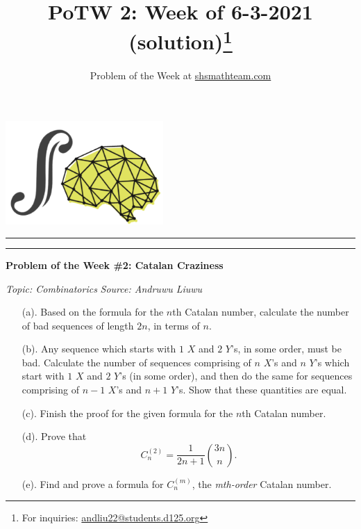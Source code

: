 \documentclass{article}
\title{{\fontfamily{lmss}\selectfont \vspace{-0.5cm}
\textbf{PoTW 2: Week of 6-3-2021 (solution)}\thanks{For inquiries: \href{mailto:andliu22@students.d125.org}{andliu22@students.d125.org}}}}
\author{Problem of the Week at \href{https://shsmathteam.com/problem-of-the-week/}{shsmathteam.com}}
\date{}
\begin{document}
\noindent\hfill\includegraphics[width=6cm]{logo.png}\hfill\hfill\newline
\rule{\textwidth}{1pt} 

\setlength{\parindent}{0cm}
{\let\newpage\relax\maketitle}
\pagestyle{regular}


\vspace{-0.45cm}\rule{\textwidth}{1pt} \vspace{0.3cm}

\begin{potw}\vspace{5pt}
{\large\textbf{Problem of the Week \#2: Catalan Craziness}}\vspace{5pt}

\textit{Topic: Combinatorics}\newline
\textit{Source: Andruwu Liuwu}

\begin{enumerate}
    \item [(a).] Based on the formula for the $n$th Catalan number, calculate the number of bad sequences of length $2n$, in terms of $n$.
    \item [(b).] Any sequence which starts with $1$ $X$ and $2$ $Y$'s, in some order, must be bad. Calculate the number of sequences comprising of $n$ $X$'s and $n$ $Y$'s which start with $1$ $X$ and $2$ $Y$'s (in some order), and then do the same for sequences comprising of $n-1$ $X$'s and $n+1$ $Y$'s. Show that these quantities are equal. 
    \item [(c).] Finish the proof for the given formula for the $n$th Catalan number. 
    \item [(d).] Prove that 
    \[C_n^{(2)} = \frac{1}{2n+1}\binom{3n}{n}.\]
    \item [(e).] Find and prove a formula for $C_n^{(m)}$, the \textit{mth-order} Catalan number.
\end{enumerate}
\end{potw}
\newpage
\end{document}
